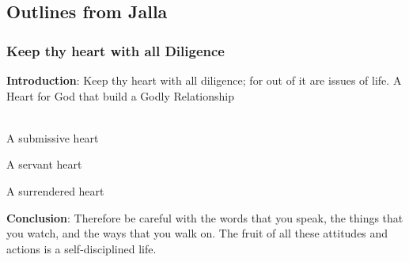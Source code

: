 \subsection{Outlines from Jalla}


\subsubsection{Keep thy heart with all Diligence}
\textbf{Introduction}: Keep thy heart with all diligence; for out of it are issues of life.
A Heart for God that build a Godly Relationship\\
\\
\begin{compactenum}[I.][4]
	\item A submissive heart 
	\item A servant heart
	\item A surrendered heart
\end{compactenum}

\textbf{Conclusion}:  Therefore be careful with the words that you speak, the things that you watch, and the ways that you walk on. The fruit of all these attitudes and actions is a self-disciplined life.



